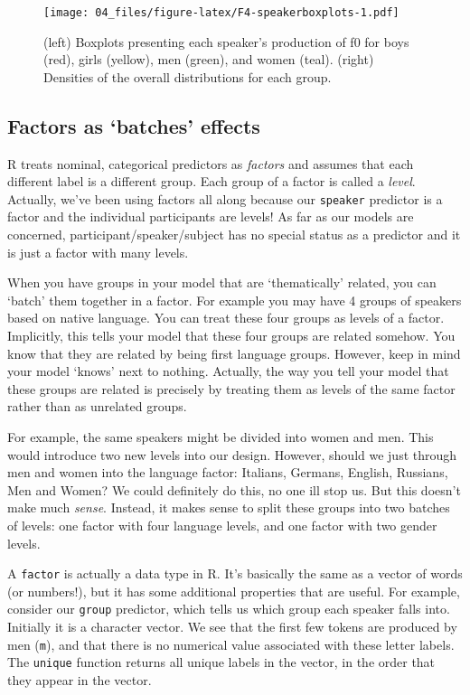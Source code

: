 \documentclass[
]{book}
\begin{document}
\begin{figure}
\centering
\texttt{[image: 04\_files/figure-latex/F4-speakerboxplots-1.pdf]}
\caption{\label{fig:F4-speakerboxplots}(left) Boxplots presenting each speaker's production of f0 for boys (red), girls (yellow), men (green), and women (teal). (right) Densities of the overall distributions for each group.}
\end{figure}

\hypertarget{factors-as-batches-effects}{%
\subsection{Factors as `batches' effects}\label{factors-as-batches-effects}}

R treats nominal, categorical predictors as \emph{factors} and assumes that each different label is a different group. Each group of a factor is called a \emph{level}. Actually, we've been using factors all along because our \texttt{speaker} predictor is a factor and the individual participants are levels! As far as our models are concerned, participant/speaker/subject has no special status as a predictor and it is just a factor with many levels.

When you have groups in your model that are `thematically' related, you can `batch' them together in a factor. For example you may have 4 groups of speakers based on native language. You can treat these four groups as levels of a factor. Implicitly, this tells your model that these four groups are related somehow. You know that they are related by being first language groups. However, keep in mind your model `knows' next to nothing. Actually, the way you tell your model that these groups are related is precisely by treating them as levels of the same factor rather than as unrelated groups.

For example, the same speakers might be divided into women and men. This would introduce two new levels into our design. However, should we just through men and women into the language factor: Italians, Germans, English, Russians, Men and Women? We could definitely do this, no one ill stop us. But this doesn't make much \emph{sense}. Instead, it makes sense to split these groups into two batches of levels: one factor with four language levels, and one factor with two gender levels.

A \texttt{factor} is actually a data type in R. It's basically the same as a vector of words (or numbers!), but it has some additional properties that are useful. For example, consider our \texttt{group} predictor, which tells us which group each speaker falls into. Initially it is a character vector. We see that the first few tokens are produced by men (\texttt{m}), and that there is no numerical value associated with these letter labels. The \texttt{unique} function returns all unique labels in the vector, in the order that they appear in the vector.
\end{document}
